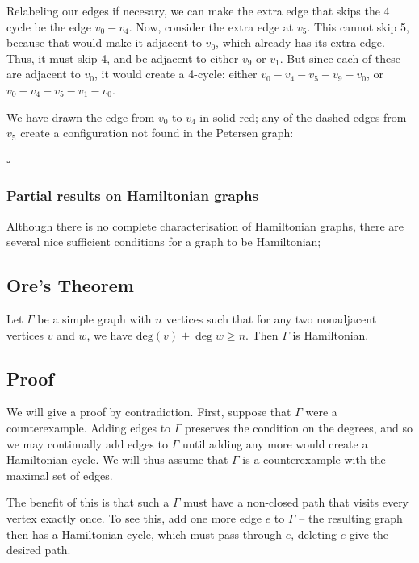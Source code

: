 \documentclass[]{article}
\begin{document}
Relabeling our edges if necesary, we can make the extra edge that skips
the 4 cycle be the edge \(v_0-v_4\). Now, consider the extra edge at
\(v_5\). This cannot skip 5, because that would make it adjacent to
\(v_0\), which already has its extra edge. Thus, it must skip 4, and be
adjacent to either \(v_9\) or \(v_1\). But since each of these are
adjacent to \(v_0\), it would create a 4-cycle: either
\(v_0-v_4-v_5-v_9-v_0\), or \(v_0-v_4-v_5-v_1-v_0\).

We have drawn the edge from \(v_0\) to \(v_4\) in solid red; any of the
dashed edges from \(v_5\) create a configuration not found in the
Petersen graph:

\(\square\)

\subsubsection{Partial results on Hamiltonian
graphs}\label{partial-results-on-hamiltonian-graphs}

Although there is no complete characterisation of Hamiltonian graphs,
there are several nice sufficient conditions for a graph to be
Hamiltonian;

\subsection{Ore's Theorem}\label{ores-theorem}

Let \(\Gamma\) be a simple graph with \(n\) vertices such that for any
two nonadjacent vertices \(v\) and \(w\), we have
\(\text{deg}(v)+\deg{w}\geq n\). Then \(\Gamma\) is Hamiltonian.

\subsection{Proof}\label{proof-5}

We will give a proof by contradiction. First, suppose that \(\Gamma\)
were a counterexample. Adding edges to \(\Gamma\) preserves the
condition on the degrees, and so we may continually add edges to
\(\Gamma\) until adding any more would create a Hamiltonian cycle. We
will thus assume that \(\Gamma\) is a counterexample with the maximal
set of edges.

The benefit of this is that such a \(\Gamma\) must have a non-closed
path that visits every vertex exactly once. To see this, add one more
edge \(e\) to \(\Gamma\) -- the resulting graph then has a Hamiltonian
cycle, which must pass through \(e\), deleting \(e\) give the desired
path.
\end{document}
